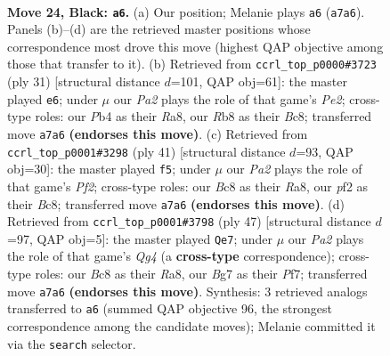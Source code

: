 \documentclass[11pt]{article}
\begin{document}
\clearpage

\begin{figure}[p]\centering
\begin{subfigure}{0.46\textwidth}\centering
\resizebox{\linewidth}{!}{%
\newchessgame
\chessboard[
  setfen={nrbr2k1/p4pb1/7p/2p1p1qP/1p5n/3PP3/PPQ2PB1/RNB1NRK1 b - - 5 24},
  showmover=false,
  pgfstyle=straightmove, color=movearrow, markmove={a7-a6}
]}
\caption{}
\end{subfigure}\hfill
\begin{subfigure}{0.46\textwidth}\centering
\resizebox{\linewidth}{!}{%
\newchessgame
\chessboard[
  setfen={r1b2rk1/1p2p1bp/6p1/p1qp1p2/P5n1/1QP2NP1/1P2PPBP/R1B2RK1 b - - 3 16},
  showmover=false,
  pgfstyle=straightmove, color=movearrow, markmove={e7-e6}
]}
\caption{}
\end{subfigure}
\\[4pt]
\begin{subfigure}{0.46\textwidth}\centering
\resizebox{\linewidth}{!}{%
\newchessgame
\chessboard[
  setfen={r1b1r1k1/p3qpb1/1p4p1/2pP3p/3nP2P/2NBBP2/PP1R1Q2/4K2R b K - 6 21},
  showmover=false,
  pgfstyle=straightmove, color=movearrow, markmove={f7-f5}
]}
\caption{}
\end{subfigure}\hfill
\begin{subfigure}{0.46\textwidth}\centering
\resizebox{\linewidth}{!}{%
\newchessgame
\chessboard[
  setfen={r3r1k1/1p3p2/2pp2pb/p1n3q1/2PN1Pbp/PPB1P3/1QBR2PP/4R1K1 b - - 0 24},
  showmover=false,
  pgfstyle=straightmove, color=movearrow, markmove={g5-e7}
]}
\caption{}
\end{subfigure}
\caption{\textbf{Move 24, Black: \texttt{a6}.} (a) Our position; Melanie plays \texttt{a6} (\texttt{a7a6}). Panels (b)--(d) are the retrieved master positions whose correspondence most drove this move (highest QAP objective among those that transfer to it). (b) Retrieved from \texttt{ccrl\_top\_p0000\#3723} (ply 31) [structural distance $d$=101, QAP obj=61]: the master played \texttt{e6}; under $\mu$ our \emph{Pa2} plays the role of that game's \emph{Pe2}; cross-type roles: our \emph{P}b4 as their \emph{R}a8, our \emph{R}b8 as their \emph{B}c8; transferred move \texttt{a7a6} \textbf{(endorses this move)}. (c) Retrieved from \texttt{ccrl\_top\_p0001\#3298} (ply 41) [structural distance $d$=93, QAP obj=30]: the master played \texttt{f5}; under $\mu$ our \emph{Pa2} plays the role of that game's \emph{Pf2}; cross-type roles: our \emph{B}c8 as their \emph{R}a8, our \emph{p}f2 as their \emph{B}c8; transferred move \texttt{a7a6} \textbf{(endorses this move)}. (d) Retrieved from \texttt{ccrl\_top\_p0001\#3798} (ply 47) [structural distance $d$=97, QAP obj=5]: the master played \texttt{Qe7}; under $\mu$ our \emph{Pa2} plays the role of that game's \emph{Qg4} (a \textbf{cross-type} correspondence); cross-type roles: our \emph{B}c8 as their \emph{R}a8, our \emph{B}g7 as their \emph{P}f7; transferred move \texttt{a7a6} \textbf{(endorses this move)}. Synthesis: 3 retrieved analogs transferred to \texttt{a6} (summed QAP objective 96, the strongest correspondence among the candidate moves); Melanie committed it via the \texttt{search} selector.}
\label{fig:thought-m47}
\end{figure}
\end{document}
